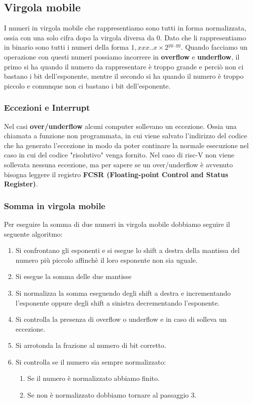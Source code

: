 \subsection{Virgola mobile}
I numeri in virgola mobile che rappresentiamo sono tutti in forma normalizzata, ossia con 
una solo cifra dopo la virgola diversa da 0.
Dato che li rappresentiamo in binario sono tutti i numeri della forma $1,xxx..x \times 2^{yy..yy}$.
Quando facciamo un operazione con questi numeri possiamo incorrere in \textbf{overflow} e \textbf{underflow}, il primo si 
ha quando il numero da rappresentare è troppo grande e perciò non ci bastano i bit dell'esponente, mentre il secondo si ha quando il 
numero è troppo piccolo e comunque non ci bastano i bit dell'esponente.

\subsubsection{Eccezioni e Interrupt}
Nel casi \textbf{over/underflow} alcuni computer sollevano un eccezione. Ossia una chiamata a funzione non programmata, in cui 
viene salvato l'indirizzo del codice che ha generato l'eccezione in modo da poter continare la normale esecuzione nel caso 
in cui del codice "risolutivo" venga fornito. 
Nel caso di risc-V non viene sollevata nessuna eccezione, ma per sapere se un over/underflow è avvenuto bisogna leggere 
il registro \textbf{FCSR (Floating-point Control and Status Register)}.

\subsubsection{Somma in virgola mobile}
Per eseguire la somma di due numeri in virgola mobile dobbiamo seguire il seguente algoritmo:
\begin{enumerate}
    \item Si confrontano gli esponenti e si esegue lo shift a destra della mantissa del numero più piccolo affinchè il loro 
    esponente non sia uguale.
    \item Si esegue la somma delle due mantisse
    \item Si normalizza la somma eseguendo degli shift a destra e incrementando l'esponente oppure degli shift a sinistra 
    decrementando l'esponente.
    \item Si controlla la presenza di overflow o underflow e in caso di solleva un eccezione.
    \item Si arrotonda la frazione al numero di bit corretto.
    \item Si controlla se il numero sia sempre normalizzato:
    \begin{enumerate}
        \item Se il numero è normalizzato abbiamo finito.
        \item Se non è normalizzato dobbiamo tornare al passaggio 3.
    \end{enumerate}
\end{enumerate}


